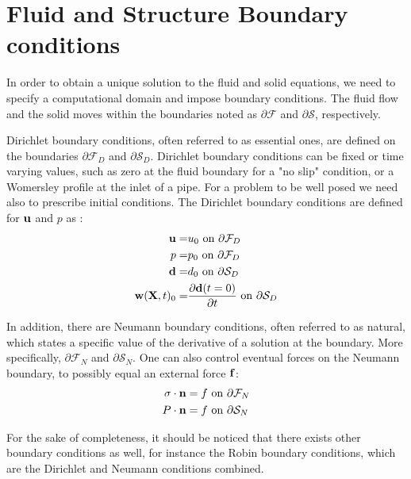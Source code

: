 \section{Fluid and Structure Boundary conditions}
In order to obtain a unique solution to the fluid and solid equations, we need to specify a computational domain and impose boundary conditions. The fluid flow and the solid moves within the boundaries noted as $ \partial\mathcal{F}$ and $ \partial \mathcal{S}$, respectively. 

Dirichlet boundary conditions, often referred to as essential ones, are defined on the boundaries $ \partial \mathcal{F}_D$ and $ \partial \mathcal{S}_D$.
Dirichlet boundary conditions can be fixed or time varying values, such as zero at the fluid boundary for a "no slip" condition, or a Womersley profile \cite{He1997} at the inlet of a pipe. For a problem to be well posed we need also to prescribe initial conditions.
The Dirichlet boundary conditions are defined for $\bold{u}$ and $p$ as :
\begin{align}
\bold{u} =& u_0 \text{   on   } \partial \mathcal{F}_D  \\
p =& p_0 \text{   on   } \partial \mathcal{F}_D  \\
\bold{d} =& d_0 \text{ on   } \partial \mathcal{S}_D  \\
\bold{w}(\textbf{X},t)_0 =& \frac{\partial \bold{d}(t=0)}{\partial t} \text{   on   } \partial \mathcal{S}_D   
\end{align}

In addition, there are Neumann boundary conditions, often referred to as natural, which states a specific value of the derivative of a solution at the boundary. More specifically, $\partial \mathcal{F}_N$ and $\partial \mathcal{S}_N$. One can also control eventual forces on the Neumann boundary, to possibly equal an external force $ \bold{f}$:
\begin{align}
\sigma \cdot \bold{n} &= f \text{   on   } \partial \mathcal{F}_N \\   
P\cdot \bold{n} &= f \text{   on   } \partial \mathcal{S}_N    
\end{align}

For the sake of completeness, it should be noticed that there exists other boundary conditions as well, for instance the Robin boundary conditions, which are the Dirichlet and Neumann conditions combined.
